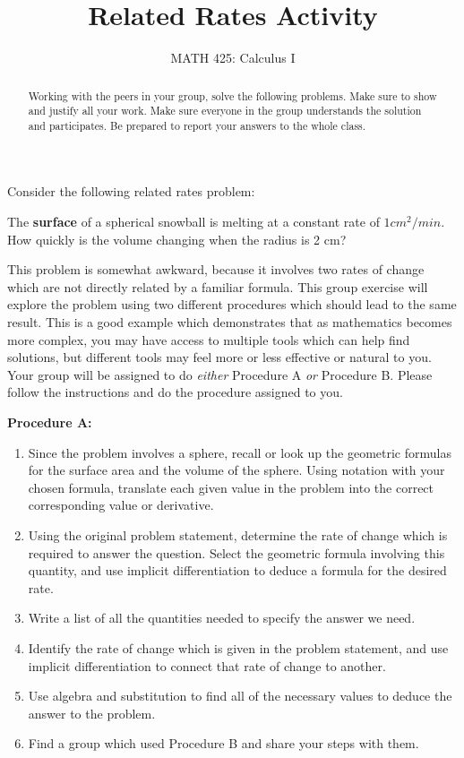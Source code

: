 \documentclass{ximera}
\title{Related Rates Activity}
\author{MATH 425: Calculus I}
\begin{document}
\begin{abstract}
   Working with the peers in your group, solve the following problems. Make sure to show and justify all your work. Make sure everyone in the group understands the solution and participates. Be prepared to report your answers to the whole class. 
\end{abstract}
\maketitle


Consider the following related rates problem:\\
\begin{example}
    The \textbf{surface} of a spherical snowball is melting at a constant rate of $1cm^2/min$.  How quickly is the volume changing when the radius is 2 cm?\\
\end{example}

This problem is somewhat awkward, because it involves two rates of change which are not directly related by a familiar formula.  This group exercise will explore the problem using two different procedures which should lead to the same result.  This is a good example which demonstrates that as mathematics becomes more complex, you may have access to multiple tools which can help find solutions, but different tools may feel more or less effective or natural to you.\\
Your group will be assigned to do \textit{either} Procedure A \textit{or} Procedure B.  Please follow the instructions and do the procedure assigned to you.

\begin{exercise} \textbf{Procedure A:}
\begin{enumerate}
    \item Since the problem involves a sphere, recall or look up the geometric formulas for the surface area and the volume of the sphere.  Using notation with your chosen formula, translate each given value in the problem into the correct corresponding value or derivative.
    \item Using the original problem statement, determine the rate of change which is required to answer the question.  Select the geometric formula involving this quantity, and use implicit differentiation to deduce a formula for the desired rate.
    \item Write a list of all the quantities needed to specify the answer we need.
    \item Identify the rate of change which is given in the problem statement, and use implicit differentiation to connect that rate of change to another. 
    \item Use algebra and substitution to find all of the necessary values to deduce the answer to the problem.  
    \item Find a group which used Procedure B and share your steps with them.
\end{enumerate}

\end{exercise}
\end{document}
